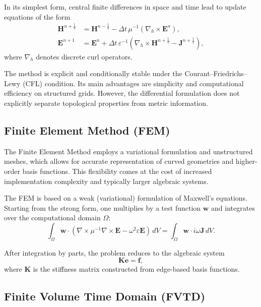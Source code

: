 In its simplest form, central finite differences in space and time lead to update equations of the form
\begin{align}
\mathbf{H}^{n+\frac12} &= \mathbf{H}^{n-\frac12}
- \Delta t \, \mu^{-1} \left( \nabla_h \times \mathbf{E}^n \right), \\
\mathbf{E}^{n+1} &= \mathbf{E}^n
+ \Delta t \, \varepsilon^{-1} \left( \nabla_h \times \mathbf{H}^{n+\frac12} - \mathbf{J}^{n+\frac12} \right),
\end{align}
where $\nabla_h$ denotes discrete curl operators.

The method is explicit and conditionally stable under the Courant–Friedrichs–Lewy (CFL) condition. Its main advantages are simplicity and computational efficiency on structured grids. However, the differential formulation does not explicitly separate topological properties from metric information.

\subsection{Finite Element Method (FEM)}
The Finite Element Method employs a variational formulation and unstructured meshes, which allows for accurate representation of curved geometries and higher-order basis functions. This flexibility comes at the cost of increased implementation complexity and typically larger algebraic systems.

The FEM is based on a weak (variational) formulation of Maxwell’s equations. Starting from the strong form, one multiplies by a test function $\mathbf{w}$ and integrates over the computational domain $\Omega$:
\begin{equation}
\int_{\Omega} \mathbf{w} \cdot 
\left( \nabla \times \mu^{-1} \nabla \times \mathbf{E}
- \omega^2 \varepsilon \mathbf{E} \right) \, dV
=
\int_{\Omega} \mathbf{w} \cdot i\omega \mathbf{J} \, dV.
\end{equation}

After integration by parts, the problem reduces to the algebraic system
\begin{equation}
\mathbf{K} \mathbf{e} = \mathbf{f},
\end{equation}
where $\mathbf{K}$ is the stiffness matrix constructed from edge-based basis functions.

\subsection{Finite Volume Time Domain (FVTD)}

